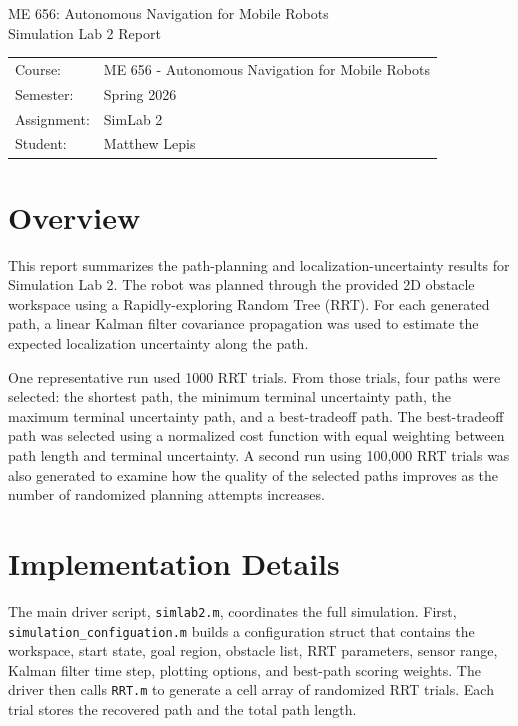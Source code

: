 \documentclass[11pt]{article}
\begin{document}
\begin{center}
{\LARGE ME 656: Autonomous Navigation for Mobile Robots}\\[0.5em]
{\Large Simulation Lab 2 Report}\\[1em]
\begin{tabular}{ll}
Course: & ME 656 - Autonomous Navigation for Mobile Robots \\
Semester: & Spring 2026 \\
Assignment: & SimLab 2 \\
Student: & Matthew Lepis \\
\end{tabular}
\end{center}

\vspace{1em}

\section{Overview}
This report summarizes the path-planning and localization-uncertainty results
for Simulation Lab 2. The robot was planned through the provided 2D obstacle
workspace using a Rapidly-exploring Random Tree (RRT). For each generated path,
a linear Kalman filter covariance propagation was used to estimate the expected
localization uncertainty along the path.

One representative run used 1000 RRT trials. From those trials, four paths
were selected: the shortest path, the minimum terminal uncertainty path, the
maximum terminal uncertainty path, and a best-tradeoff path. The best-tradeoff
path was selected using a normalized cost function with equal weighting between
path length and terminal uncertainty. A second run using 100,000 RRT trials was
also generated to examine how the quality of the selected paths improves as
the number of randomized planning attempts increases.

\section{Implementation Details}

The main driver script, \texttt{simlab2.m}, coordinates the full simulation.
First, \texttt{simulation\_configuation.m} builds a configuration struct that
contains the workspace, start state, goal region, obstacle list, RRT
parameters, sensor range, Kalman filter time step, plotting options, and
best-path scoring weights. The driver then calls \texttt{RRT.m} to generate a
cell array of randomized RRT trials. Each trial stores the recovered path and
the total path length.
\end{document}
